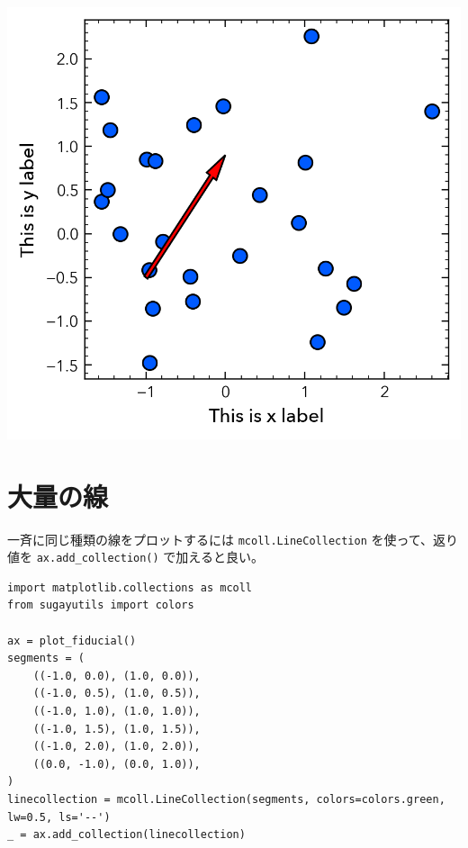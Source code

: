 \documentclass[a4paper, 10pt, notitlepage, twocolumn, uplatex, oneside, dvipdfmx]{jsarticle}
\begin{document}
\begin{center}
\includegraphics[width=1.0\linewidth]{./obipy-resources/params_arrow.png}
\end{center}
\section{大量の線}
\label{sec:org2127733}
一斉に同じ種類の線をプロットするには \texttt{mcoll.LineCollection} を使って、返り値を \texttt{ax.add\_collection()} で加えると良い。
\begin{verbatim}
import matplotlib.collections as mcoll
from sugayutils import colors

ax = plot_fiducial()
segments = (
    ((-1.0, 0.0), (1.0, 0.0)),
    ((-1.0, 0.5), (1.0, 0.5)),
    ((-1.0, 1.0), (1.0, 1.0)),
    ((-1.0, 1.5), (1.0, 1.5)),
    ((-1.0, 2.0), (1.0, 2.0)),
    ((0.0, -1.0), (0.0, 1.0)),
)
linecollection = mcoll.LineCollection(segments, colors=colors.green, lw=0.5, ls='--')
_ = ax.add_collection(linecollection)
\end{verbatim}
\end{document}
